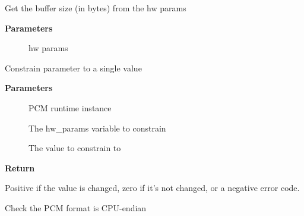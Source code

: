 \documentclass[a4paper,8pt,english]{sphinxmanual}
\begin{document}
\begin{fulllineitems}
\label{sound/kernel-api/alsa-driver-api:c.params_buffer_bytes}
Get the buffer size (in bytes) from the hw params

\end{fulllineitems}


\textbf{Parameters}
\begin{description}
\item[{}] \leavevmode
hw params

\end{description}

\begin{fulllineitems}
\label{sound/kernel-api/alsa-driver-api:c.snd_pcm_hw_constraint_single}
Constrain parameter to a single value

\end{fulllineitems}


\textbf{Parameters}
\begin{description}
\item[{}] \leavevmode
PCM runtime instance

\item[{}] \leavevmode
The hw\_params variable to constrain

\item[{}] \leavevmode
The value to constrain to

\end{description}

\textbf{Return}

Positive if the value is changed, zero if it's not changed, or a
negative error code.

\begin{fulllineitems}
\label{sound/kernel-api/alsa-driver-api:c.snd_pcm_format_cpu_endian}
Check the PCM format is CPU-endian

\end{fulllineitems}
\end{document}
